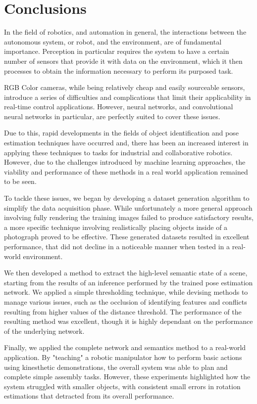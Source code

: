 \chapter{Conclusions}

In the field of robotics, and automation in general, the interactions between the autonomous system, or robot, and the environment, are of fundamental importance. Perception in particular requires the system to have a certain number of sensors that provide it with data on the environment, which it then processes to obtain the information necessary to perform its purposed task.

RGB Color cameras, while being relatively cheap and easily sourceable sensors, introduce a series of difficulties and complications that limit their applicability in real-time control applications. However, neural networks, and convolutional neural networks in particular, are perfectly suited to cover these issues.

Due to this,  rapid developments in the fields of object identification and pose estimation techniques have occurred and, there has been an increased interest in applying these techniques to tasks for industrial and collaborative robotics. However, due to the challenges introduced by machine learning approaches, the viability and performance of these methods in a real world application remained to be seen.

To tackle these issues, we began by developing a dataset generation algorithm to simplify the data acquisition phase. While unfortunately a more general approach involving fully rendering the training images failed to produce satisfactory results, a more specific technique involving realistically placing objects inside of a photograph proved to be effective. These generated datasets resulted in excellent performance, that did not decline in a noticeable manner when tested in a real-world environment.

We then developed a method to extract the high-level semantic state of a scene, starting from the results of an inference performed by the trained pose estimation network. We applied a simple thresholding technique, while devising methods to manage various issues, such as the occlusion of identifying features and conflicts resulting from higher values of the distance threshold. The performance of the resulting method was excellent, though it is highly dependant on the performance of the underlying network.

Finally, we applied the complete network and semantics method to a real-world application. By "teaching" a robotic manipulator how to perform basic actions using kinesthetic demonstrations, the overall system was able to plan and complete simple assembly tasks. However, these experiments highlighted how the system struggled with smaller objects, with consistent small errors in rotation estimations that detracted from its overall performance.

